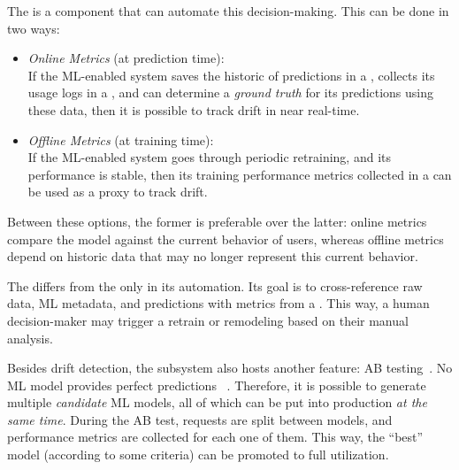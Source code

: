   The  is a component that can
  automate this decision-making. This can be done in two ways:
  \begin{itemize}
    \item \emph{Online Metrics} (at prediction time): \\
           If the ML-enabled system
           saves the historic of predictions in a 
           ,
           collects its usage logs in a
           ,
           and can determine a \emph{ground truth} for its
           predictions using these data,
           then it is possible to track drift in near real-time.
    \item \emph{Offline Metrics} (at training time): \\
           If the ML-enabled system goes through periodic retraining,
           and its performance is stable, then its training performance
           metrics collected in a 
           can be used as a proxy to track drift.
  \end{itemize}
  Between these options, the former is preferable over the latter: online
  metrics compare the model against the current behavior of users, whereas
  offline metrics depend on historic data that may no longer represent
  this current behavior.

  The  differs from the
   only in its automation.
  Its goal is to cross-reference raw data, ML metadata, and predictions
  with metrics from a . This way,
  a human decision-maker may trigger a retrain or remodeling based
  on their manual analysis.
  

  Besides drift detection, the  subsystem also
  hosts another feature: AB testing~\parencite{Kohavi2020TrustworthyExperiments, 
  Lakshmanan2020MachineMLOps}. No ML model provides perfect predictions%
  ~\parencite{Burkov2020MachineEngineering,Hulten2018BuildingEngineering}.
  Therefore, it is possible to generate multiple \emph{candidate} ML models,
  all of which can be put into production \emph{at the same time}. During
  the AB test, requests are split between models, and performance metrics
  are collected for each one of them. This way, the ``best'' model
  (according to some criteria) can be promoted to full utilization.

